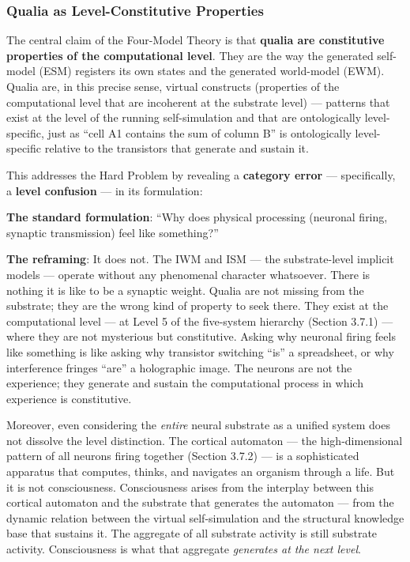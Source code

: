 \documentclass[12pt]{article}
\begin{document}
\subsubsection{Qualia as Level-Constitutive Properties}


The central claim of the Four-Model Theory is that \textbf{qualia are constitutive properties of the computational level}. They are the way the generated self-model (ESM) registers its own states and the generated world-model (EWM). Qualia are, in this precise sense, virtual constructs (properties of the computational level that are incoherent at the substrate level) --- patterns that exist at the level of the running self-simulation and that are ontologically level-specific, just as ``cell A1 contains the sum of column B'' is ontologically level-specific relative to the transistors that generate and sustain it.

This addresses the Hard Problem by revealing a \textbf{category error} --- specifically, a \textbf{level confusion} --- in its formulation:

\textbf{The standard formulation}: ``Why does physical processing (neuronal firing, synaptic transmission) feel like something?''

\textbf{The reframing}: It does not. The IWM and ISM --- the substrate-level implicit models --- operate without any phenomenal character whatsoever. There is nothing it is like to be a synaptic weight. Qualia are not missing from the substrate; they are the wrong kind of property to seek there. They exist at the computational level --- at Level 5 of the five-system hierarchy (Section 3.7.1) --- where they are not mysterious but constitutive. Asking why neuronal firing feels like something is like asking why transistor switching ``is'' a spreadsheet, or why interference fringes ``are'' a holographic image. The neurons are not the experience; they generate and sustain the computational process in which experience is constitutive.

Moreover, even considering the \emph{entire} neural substrate as a unified system does not dissolve the level distinction. The cortical automaton --- the high-dimensional pattern of all neurons firing together (Section 3.7.2) --- is a sophisticated apparatus that computes, thinks, and navigates an organism through a life. But it is not consciousness. Consciousness arises from the interplay between this cortical automaton and the substrate that generates the automaton --- from the dynamic relation between the virtual self-simulation and the structural knowledge base that sustains it. The aggregate of all substrate activity is still substrate activity. Consciousness is what that aggregate \emph{generates at the next level}.
\end{document}
